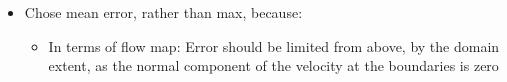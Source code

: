 \begin{framed}
\begin{itemize}
            \item Chose mean error, rather than max, because:
                \begin{itemize}
                    \item In terms of flow map: Error should be limited from above, by the domain extent, as the normal component
                        of the velocity at the boundaries is zero

\end{itemize}
\end{itemize}
\end{framed}

